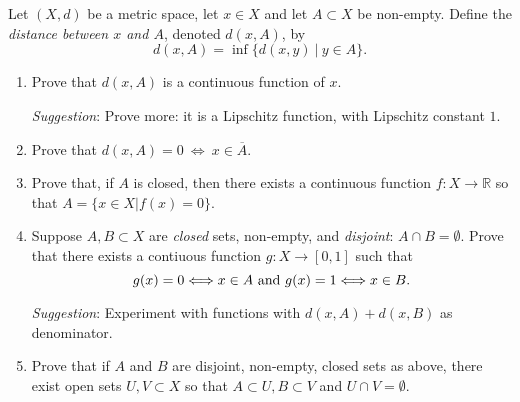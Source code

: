 \documentclass{jhwhw}
\newcommand{\R}{{\mathbb R}}
\begin{document}
\solution{}

\part{}

\problem{}%
Let $(X,d)$ be a metric space, let $x\in X$ and let $A\subset X$ be non-empty.  Define the \emph{distance between $x$ and $A$}, denoted $d(x,A)$, by
$$
d(x,A) = \inf \{d(x,y)\  | \  y\in A\}.
$$
\begin{enumerate}
	\item Prove that $d(x,A)$ is a continuous function of $x$. 
	
	\emph{Suggestion}:  Prove more: it is a Lipschitz function, with Lipschitz constant $1$.
	
	\item Prove that $d(x,A) = 0\  \Longleftrightarrow \  x\in\overline{A}$.
	
	\item Prove that, if $A$ is closed, then there exists a continuous function $f:X\to\R$ so that $ A = \{x\in X | f(x) = 0\}$.
	
	
	
	\item Suppose $A,B\subset X$ are \emph{closed} sets, non-empty, and \emph{disjoint}: $A\cap B = \emptyset$. Prove that there exists a contiuous function $g:X\to [0,1]$ such that 
	$$
	g(x) = 0 \Longleftrightarrow x\in A \hbox{ and } g(x) = 1 \Longleftrightarrow x\in B.
	$$
	
	\emph{Suggestion}: Experiment with  functions with $d(x,A) + d(x,B)$ as denominator.
	
	\item Prove that if $A$ and $B$ are disjoint, non-empty, closed sets as above, there exist open sets $U,V\subset X$ so that $A\subset U, B\subset V$ and $U\cap V = \emptyset$.
\end{enumerate}

\solution{}
\part{}
\end{document}
